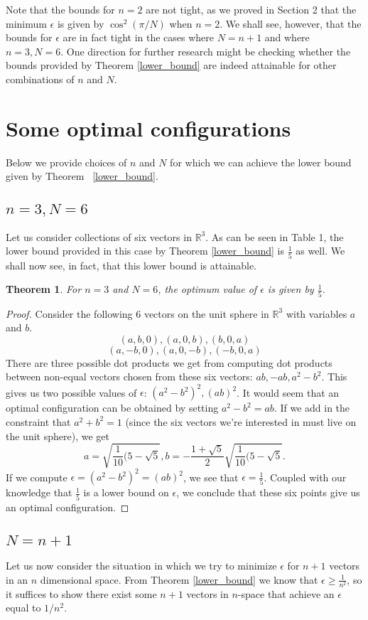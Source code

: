 \documentclass[11pt,letterpaper,twoside,english]{article}
\theoremstyle{theorem}
\newtheorem{theorem}{Theorem}[section]
\theoremstyle{remark}
\providecommand{\R}{\mathbb{R}}
\begin{document}
Note that the bounds for $n=2$ are not tight, as we proved in Section 2 that the minimum $\epsilon$ is given by $\cos^2(\pi/N)$ when $n=2$. We shall see, however, that the bounds for $\epsilon$ are in fact tight in the cases where $N=n+1$ and where $n=3, N=6$. One direction for further research might be checking whether the bounds provided by Theorem \ref{lower_bound} are indeed attainable for other combinations of $n$ and $N$.

\section{Some optimal configurations}
Below we provide choices of $n$ and $N$ for which we can achieve the lower bound given by Theorem ~\ref{lower_bound}.
\subsection{$n=3,N=6$}
Let us consider collections of six vectors in $\mathbb R^3$. As can be seen in Table 1, the lower bound provided in this case by Theorem \ref{lower_bound} is $\frac 1 5$ as well. We shall now see, in fact, that this lower bound is attainable.
\begin{theorem}
For $n=3$ and $N=6$, the optimum value of $\epsilon$ is given by $\frac 1 5$.
\end{theorem}
\begin{proof}Consider the following 6 vectors on the unit sphere in $\R^3$ with variables $a$ and $b$. 
$$
(a,b,0),(a,0,b),(b,0,a)
$$
$$
(a,-b,0),(a,0,-b),(-b,0,a)
$$
There are three possible dot products we get from computing dot products between non-equal vectors chosen from these six vectors: $ab,-ab,a^2-b^2$. This gives us two possible values of $\epsilon$: $(a^2-b^2)^2,(ab)^2$. It would seem that an optimal configuration can be obtained by setting $a^2-b^2=ab$. If we add in the constraint that $a^2+b^2=1$ (since the six vectors we're interested in must live on the unit sphere), we get
$$
a=\sqrt{\frac{1}{10}(5-\sqrt{5}}, b=-\frac{1+\sqrt{5}}{2}\sqrt{\frac{1}{10}(5-\sqrt{5}}. 
$$
If we compute $\epsilon=(a^2-b^2)^2=(ab)^2$, we see that $\epsilon=\frac{1}{5}$. Coupled with our knowledge that $\frac 1 5$ is a lower bound on $\epsilon$, we conclude that these six points give us an optimal configuration.\end{proof}
\subsection{$N=n+1$}
Let us now consider the situation in which we try to minimize $\epsilon$ for $n+1$ vectors in an $n$ dimensional space. From Theorem \ref{lower_bound} we know that $\epsilon\ge \frac{1}{n^2}$, so it suffices to show there exist some $n+1$ vectors in $n$-space that achieve an $\epsilon$ equal to $1/n^2$.
\end{document}
